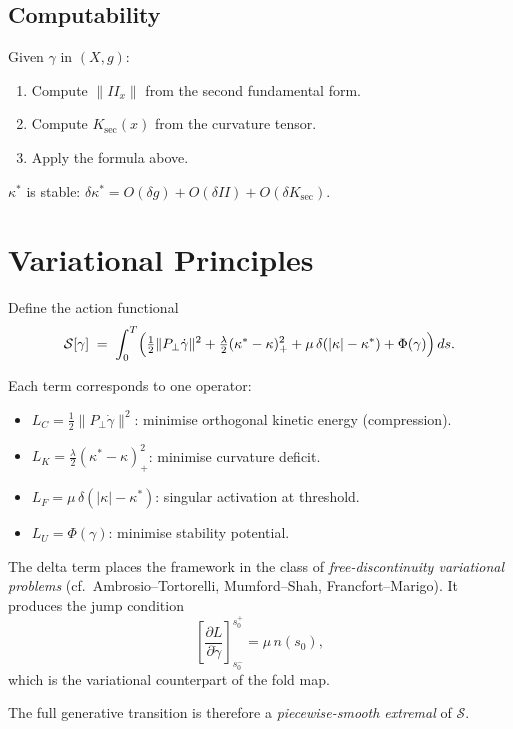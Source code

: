\documentclass[12pt, oneside]{book}
\theoremstyle{plain}
\theoremstyle{definition}
\theoremstyle{remark}
\begin{document}
\subsection{Computability}

Given $\gamma$ in $(X,g)$:
\begin{enumerate}
\item Compute $\|II_x\|$ from the second fundamental form.
\item Compute $K_{\mathrm{sec}}(x)$ from the curvature tensor.
\item Apply the formula above.
\end{enumerate}

$\kappa^*$ is stable:
$\delta\kappa^* = O(\delta g) + O(\delta II)
  + O(\delta K_{\mathrm{sec}})$.

\section{Variational Principles}

Define the action functional
\[
\mathcal{S}[\gamma] \;=\; \int_0^T
\Bigl(
\tfrac{1}{2}\|P_\perp \dot\gamma\|^2
+ \tfrac{\lambda}{2}(\kappa^* - \kappa)_+^2
+ \mu\,\delta(|\kappa| - \kappa^*)
+ \Phi(\gamma)
\Bigr)\,ds.
\]

Each term corresponds to one operator:
\begin{itemize}
\item $L_C = \tfrac{1}{2}\|P_\perp\dot\gamma\|^2$: minimise
  orthogonal kinetic energy (compression).
\item $L_K = \tfrac{\lambda}{2}(\kappa^*-\kappa)_+^2$: minimise
  curvature deficit.
\item $L_F = \mu\,\delta(|\kappa|-\kappa^*)$: singular activation
  at threshold.
\item $L_U = \Phi(\gamma)$: minimise stability potential.
\end{itemize}

The delta term places the framework in the class of
\emph{free-discontinuity variational problems}
(cf.\ Ambrosio--Tortorelli, Mumford--Shah, Francfort--Marigo).
It produces the jump condition
\[
\left[\frac{\partial L}{\partial \dot\gamma}\right]_{s_0^-}^{s_0^+}
= \mu\,n(s_0),
\]
which is the variational counterpart of the fold map.

The full generative transition is therefore a
\emph{piecewise-smooth extremal} of $\mathcal{S}$.
\end{document}
